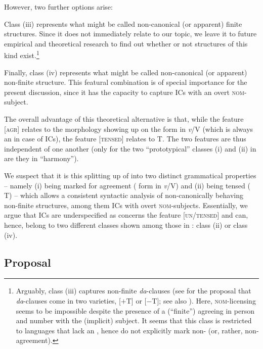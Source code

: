\documentclass[output=paper,colorlinks,citecolor=brown,newtxmath]{langsci/langscibook}
\begin{document}
However, two further options arise:

Class (iii) represents what might be called non-canonical (or apparent) finite structures. Since it does not immediately relate to our topic, we leave it to future empirical and theoretical research to find out whether or not structures of this kind exist.\footnote{Arguably, class (iii) captures  non-finite \textit{da}-clauses (see \citealt{KrapovaPetkov1999} for the proposal that  \textit{da}-clauses come in two varieties, [$+$T] or [$-$T]; see also \citealt{Pitsch2018}). Here, \textsc{nom}-licensing seems to be impossible despite the presence of a (``finite'')  agreeing in person and number with the (implicit) subject. It seems that this class is restricted to languages that lack an , hence do not explicitly mark non- (or, rather, non-agreement).}

Finally, class (iv) represents what might be called non-cano\-nical (or apparent) non-finite structure. This featural combination is of special importance for the present discussion, since it has the capacity to capture  ICs with an overt \textsc{nom}-subject.

The overall advantage of this theoretical alternative is that, while the feature [\textsc{agr}] relates to the  morphology showing up on the  form in \textit{v}/V (which is always an  in case of ICs), the feature [\textsc{tensed}] relates to T. The two features are thus independent of one another (only for the two ``prototypical'' classes (i) and (ii) in  are they in ``harmony'').

We suspect that it is this splitting up of  into two distinct grammatical properties -- namely (i) being marked for agreement ( form in \textit{v}/V) and (ii) being tensed ( T) -- which allows a consistent syntactic analysis of non-canonically behaving non-finite structures, among them  ICs with overt \textsc{nom}-subjects. Essentially, we argue that ICs are underspecified as concerns the feature [\textsc{un/tensed}] and can, hence, belong to two different classes shown among those in : class (ii) or class (iv).


\subsection{Proposal}\label{sec:nom_proposal}
\end{document}
